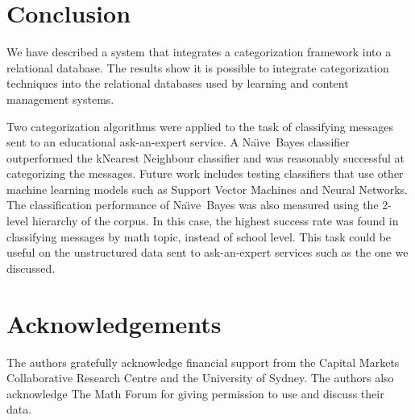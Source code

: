 \documentclass{article}
\newcommand{\naive}{Na\"\i ve}
\begin{document}
 
\section{Conclusion}

We have described a system that integrates a categorization framework into a 
relational database. The results show it is possible to integrate categorization 
techniques into the relational databases used by learning and content management 
systems.

Two categorization algorithms were applied to the task of classifying
messages sent to an educational ask-an-expert service.  A \naive\
Bayes classifier outperformed the k\-Nearest Neighbour classifier and
was reasonably successful at categorizing the messages. Future work
includes testing classifiers that use other machine learning models
such as Support Vector Machines and Neural Networks.  The
classification performance of \naive\ Bayes was also measured using the
2-level hierarchy of the corpus. In this case, the highest success
rate was found in classifying messages by math topic, instead of
school level. This task could be useful on the unstructured data sent
to ask-an-expert services such as the one we discussed.

\section*{Acknowledgements}

The authors gratefully acknowledge financial support from the Capital Markets 
Collaborative Research Centre and the University of Sydney. The authors also 
acknowledge The Math Forum for giving permission to use and discuss their data. 



\end{document}
